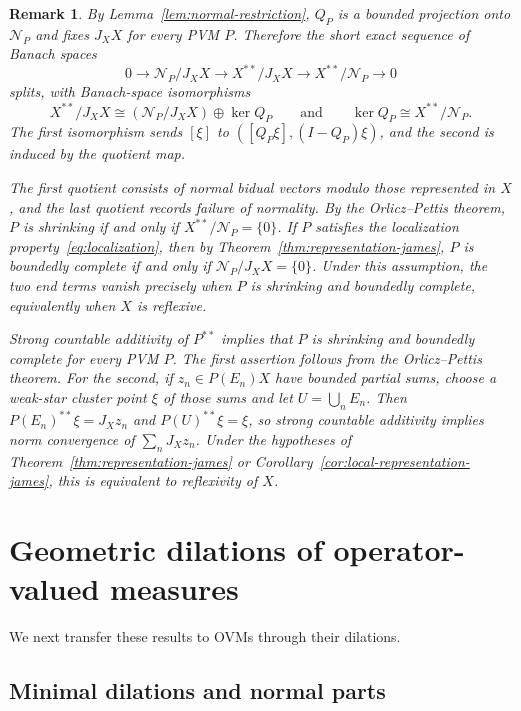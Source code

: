 \documentclass[11pt,leqno]{amsart}
\theoremstyle{compact}
\numberwithin{equation}{section}
\theoremstyle{compactremark}
\newtheorem{remark}[theorem]{Remark}
\theoremstyle{compact}
\newcommand{\1}{\mathbbm{1}}
\begin{document}
\begin{remark}\label{rem:normal-quotients}
\begingroup
By Lemma~\ref{lem:normal-restriction}, $Q_P$ is a bounded projection onto $\mathcal N_P$ and fixes $J_XX$ for every PVM $P$. Therefore the short exact sequence of Banach spaces
\[
0\longrightarrow\mathcal N_P/J_XX\longrightarrow X^{**}/J_XX\longrightarrow X^{**}/\mathcal N_P\longrightarrow0
\]
splits, with Banach-space isomorphisms
\[
X^{**}/J_XX\cong(\mathcal N_P/J_XX)\oplus\ker Q_P\qquad\text{and}\qquad \ker Q_P\cong X^{**}/\mathcal N_P.
\]
The first isomorphism sends $[\xi]$ to $([Q_P\xi],(I-Q_P)\xi)$, and the second is induced by the quotient map.
\par\endgroup
The first quotient consists of normal bidual vectors modulo those represented in $X$, and the last quotient records failure of normality. By the Orlicz--Pettis theorem, $P$ is shrinking if and only if $X^{**}/\mathcal N_P=\{0\}$. If $P$ satisfies the localization property~\eqref{eq:localization}, then by Theorem~\ref{thm:representation-james}, $P$ is boundedly complete if and only if $\mathcal N_P/J_XX=\{0\}$. Under this assumption, the two end terms vanish precisely when $P$ is shrinking and boundedly complete, equivalently when $X$ is reflexive.

Strong countable additivity of $P^{**}$ implies that $P$ is shrinking and boundedly complete for every PVM $P$. The first assertion follows from the Orlicz--Pettis theorem. For the second, if $z_n\in P(E_n)X$ have bounded partial sums, choose a weak-star cluster point $\xi$ of those sums and let $U=\bigcup_nE_n$. Then $P(E_n)^{**}\xi=J_Xz_n$ and $P(U)^{**}\xi=\xi$, so strong countable additivity implies norm convergence of $\sum_nJ_Xz_n$. Under the hypotheses of Theorem~\ref{thm:representation-james} or Corollary~\ref{cor:local-representation-james}, this is equivalent to reflexivity of $X$.
\end{remark}

\section[Geometric dilations of operator-valued measures]{Geometric dilations of operator-valued measures}\label{sec:cyclic-dilations}

We next transfer these results to OVMs through their dilations.

\subsection[Minimal dilations and normal parts]{Minimal dilations and normal parts}
\end{document}

